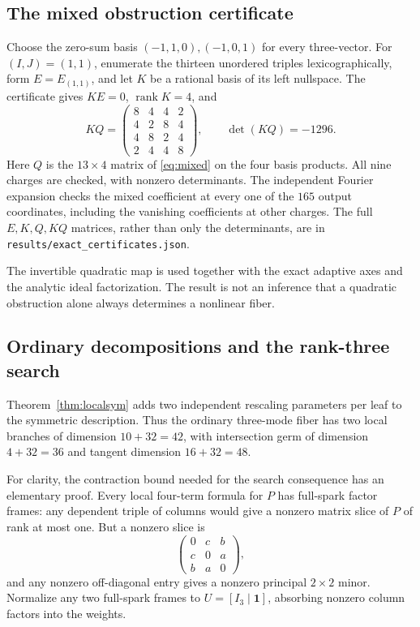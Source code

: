 \documentclass[11pt]{article}
\theoremstyle{definition}\newtheorem{definition}[theorem]{Definition}
\newcommand{\rank}{\operatorname{rank}}
\newcommand{\one}{\mathbf 1}
\begin{document}
\subsection{The mixed obstruction certificate}
Choose the zero-sum basis $(-1,1,0),(-1,0,1)$ for every three-vector. For $(I,J)=(1,1)$, enumerate the thirteen unordered triples lexicographically, form $E=E_{(1,1)}$, and let $K$ be a rational basis of its left nullspace. The certificate gives $KE=0$, $\rank K=4$, and
\begin{equation}\label{eq:obstruction}
KQ=
\begin{pmatrix}
8&4&4&2\\
4&2&8&4\\
4&8&2&4\\
2&4&4&8
\end{pmatrix},\qquad \det(KQ)=-1296.
\end{equation}
Here $Q$ is the $13\times4$ matrix of \eqref{eq:mixed} on the four basis products. All nine charges are checked, with nonzero determinants. The independent Fourier expansion checks the mixed coefficient at every one of the $165$ output coordinates, including the vanishing coefficients at other charges. The full $E,K,Q,KQ$ matrices, rather than only the determinants, are in \texttt{results/exact\_certificates.json}.

The invertible quadratic map is used together with the exact adaptive axes and the analytic ideal factorization. The result is not an inference that a quadratic obstruction alone always determines a nonlinear fiber.

\subsection{Ordinary decompositions and the rank-three search}
Theorem~\ref{thm:localsym} adds two independent rescaling parameters per leaf to the symmetric description. Thus the ordinary three-mode fiber has two local branches of dimension $10+32=42$, with intersection germ of dimension $4+32=36$ and tangent dimension $16+32=48$.

For clarity, the contraction bound needed for the search consequence has an elementary proof. Every local four-term formula for $P$ has full-spark factor frames: any dependent triple of columns would give a nonzero matrix slice of $P$ of rank at most one. But a nonzero slice is
\[
\begin{pmatrix}0&c&b\\c&0&a\\b&a&0\end{pmatrix},
\]
and any nonzero off-diagonal entry gives a nonzero principal $2\times2$ minor. Normalize any two full-spark frames to $U=[I_3\mid\one]$, absorbing nonzero column factors into the weights.
\end{document}
